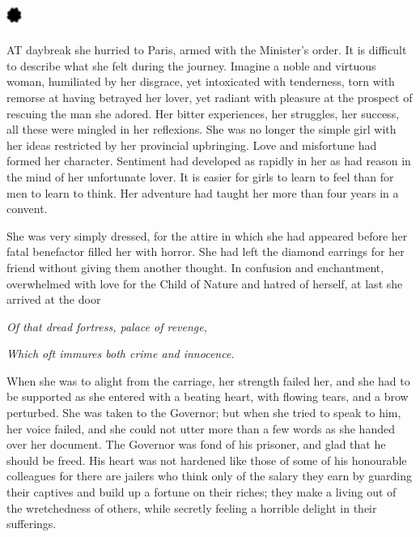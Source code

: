 \documentclass{article}
\begin{document}
\begin{center}
\section*{%
\includegraphics[width=14pt, height=15pt, keepaspectratio=true]{Zadig or L'Ingenu - Voltaire-fig040.jpg}
}

 

AT daybreak she hurried to Paris, armed with the Minister's order. It is difficult 
to describe what she felt during the journey. Imagine a noble and virtuous woman, 
humiliated by her disgrace, yet intoxicated with tenderness, torn with remorse 
at having betrayed her lover, yet radiant with pleasure at the prospect of rescuing 
the man she adored. Her bitter experiences, her struggles, her success, all these 
were mingled in her reflexions. She was no longer the simple girl with her ideas 
restricted by her provincial upbringing. Love and misfortune had formed her character. 
Sentiment had developed as rapidly in her as had reason in the mind of her unfortunate 
lover. It is easier for girls to learn to feel than for men to learn to think. 
Her adventure had taught her more than four years in a convent. 

She was very simply dressed, for the attire in which she had appeared before her 
fatal benefactor filled her with horror. She had left the diamond earrings for 
her friend without giving them another thought. In confusion and enchantment, overwhelmed 
with love for the Child of Nature and hatred of herself, at last she arrived at 
the door 

\textit{Of that dread fortress, palace of revenge}, 

\textit{Which oft immures both crime and innocence. }

When she was to alight from the carriage, her strength failed her, and she had 
to be supported as she entered with a beating heart, with flowing tears, and a 
brow perturbed. She was taken to the Governor; but when she tried to speak to him, 
her voice failed, and she could not utter more than a few words as she handed over 
her document. The Governor was fond of his prisoner, and glad that he should be 
freed. His heart was not hardened like those of some of his honourable colleagues 
for there are jailers who think only of the salary they earn by guarding their 
captives and build up a fortune on their riches; they make a living out of the 
wretchedness of others, while secretly feeling a horrible delight in their sufferings. 


\end{center}
\end{document}
